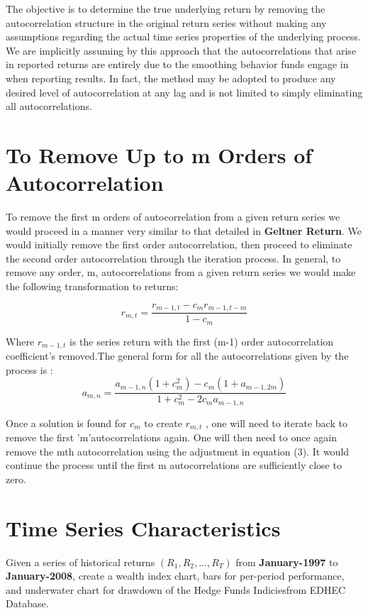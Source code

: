 \documentclass[12pt,letterpaper,english]{article}
\begin{document}
The objective is to determine the true underlying return by removing the
autocorrelation structure in the original return series without making any assumptions regarding the actual time series properties of the underlying process. We are implicitly assuming by this approach that the autocorrelations that arise in reported returns are entirely due to the smoothing behavior funds engage in when reporting results. In fact, the method may be adopted to produce any desired level of autocorrelation at any lag and is not limited to simply eliminating all autocorrelations.

\section{To Remove Up to m Orders of Autocorrelation}
To remove the first m orders of autocorrelation from a given return series we would proceed in a manner very similar to that detailed in \textbf{Geltner Return}. We would initially remove the first order autocorrelation, then proceed to eliminate the second order autocorrelation through the iteration process. In general, to remove any order, m, autocorrelations from a given return series we would make the following transformation to returns:

\begin{equation}
r_{m,t}=\frac{r_{m-1,t}-c_{m}r_{m-1,t-m}}{1-c_{m}}
\end{equation}

Where  \(r_{m-1,t}\) is the series return with the first (m-1) order autocorrelation coefficient's removed.The general form for all the autocorrelations given by the process is : 
\begin{equation}
a_{m,n}=\frac{a_{m-1,n}(1+c_{m}^2)-c_{m}(1+a_{m-1,2m})}{1+c_{m}^2 -2c_{m}a_{m-1,n}}
\end{equation}

Once a solution is found for \(c_{m}\) to create \(r_{m,t}\) , one will need to iterate back to remove the first 'm'autocorrelations again. One will then need to once again remove the mth autocorrelation using the adjustment in equation (3). It would continue the process until the first m autocorrelations are sufficiently close to zero.

\section{Time Series Characteristics}

Given a series  of historical returns \((R_1,R_2, . . .,R_T)\) from \textbf{January-1997} to \textbf{January-2008}, create a wealth index chart, bars for per-period performance, and underwater chart for drawdown of the  Hedge Funds Indiciesfrom EDHEC Database.
\end{document}
